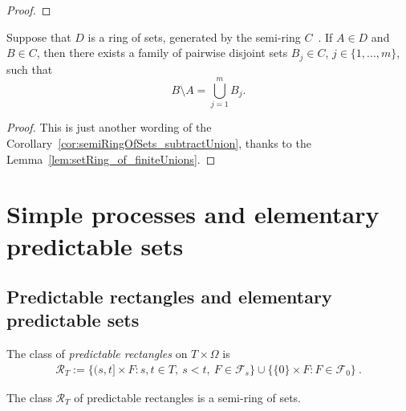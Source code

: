 \begin{proof}
  \leanok
\end{proof}

\begin{corollary}\label{cor:semiRingOfSets_subtract_ringElem}
  Suppose that $D$ is a ring of sets, generated by the semi-ring $C$~.
  If $A\in D$ and $B\in C$, then
  there exists a family of pairwise disjoint sets $B_j \in C$, $j \in \{1, ..., m\}$,
  such that
  \[
    B\setminus A = \bigcup_{j=1}^m B_j.
  \]
\end{corollary}

\begin{proof}
This is just another wording of the Corollary~\ref{cor:semiRingOfSets_subtractUnion},
thanks to the Lemma~\ref{lem:setRing_of_finiteUnions}.
\end{proof}


\section{Simple processes and elementary predictable sets}

\subsection{Predictable rectangles and elementary predictable sets}

\begin{definition}\label{def:predictableRectangles}
  \leanok
The class of \emph{predictable rectangles} on $T \times \Omega$ is
\begin{align*}
  \mathcal{R}_T :=
  \big\{(s, t] \times F : s, t \in T,\ s < t,\ F \in \mathcal{F}_s\big\}
  \cup \big\{\{0\} \times F : F \in \mathcal{F}_0\big\}
  \: .
\end{align*}
\end{definition}

\begin{lemma}\label{lem:predictableRectangles_isSetSemiring}
  \leanok
The class $\mathcal{R}_T$ of predictable rectangles
 is a semi-ring of sets.
\end{lemma}

